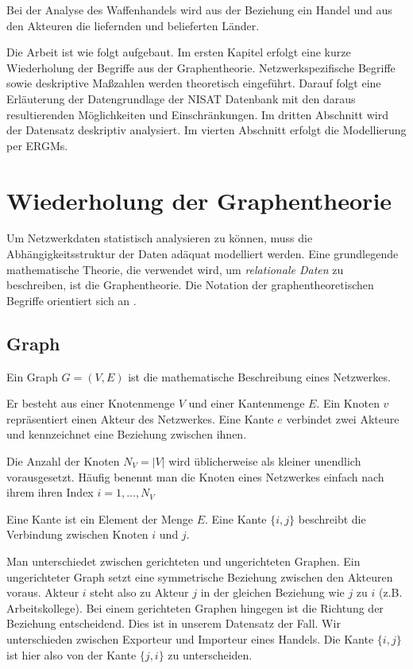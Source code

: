 \documentclass[a4paper,ngerman,oneside,titlepage,bibliography=totoc,11pt]{scrreprt}
\begin{document}
Bei der Analyse des Waffenhandels wird aus der Beziehung ein Handel und aus den Akteuren die liefernden und belieferten Länder.

Die Arbeit ist wie folgt aufgebaut. Im ersten Kapitel erfolgt eine kurze Wiederholung der Begriffe aus der Graphentheorie. Netzwerkspezifische Begriffe sowie deskriptive Maßzahlen werden theoretisch eingeführt. Darauf folgt eine Erläuterung der Datengrundlage der NISAT Datenbank mit den daraus resultierenden Möglichkeiten und Einschränkungen. Im dritten Abschnitt wird der Datensatz deskriptiv analysiert. Im vierten Abschnitt erfolgt die Modellierung per ERGMs.





\section{Wiederholung der Graphentheorie}

Um Netzwerkdaten statistisch analysieren zu können, muss die Abhängigkeitsstruktur der Daten adäquat modelliert werden. Eine grundlegende mathematische Theorie, die verwendet wird, um \emph{relationale Daten} zu beschreiben, ist die Graphentheorie. Die Notation der graphentheoretischen Begriffe orientiert sich an \cite{kc14}.

\subsection{Graph}

Ein Graph $G = (V,E)$ ist die mathematische Beschreibung eines Netzwerkes. 

Er besteht aus einer Knotenmenge $V$ und einer Kantenmenge $E$. Ein Knoten $v$ repräsentiert einen Akteur des Netzwerkes. Eine Kante $e$ verbindet zwei Akteure und kennzeichnet eine Beziehung zwischen ihnen.

Die Anzahl der Knoten $N_V = |V|$ wird üblicherweise als kleiner unendlich vorausgesetzt. Häufig benennt man die Knoten eines Netzwerkes einfach nach ihrem ihren Index $i = 1, ..., N_V$

Eine Kante ist ein Element der Menge $E$. Eine Kante $\{i,j\}$ beschreibt die Verbindung zwischen Knoten $i$ und $j$. 

Man unterschiedet zwischen gerichteten und ungerichteten Graphen. Ein ungerichteter Graph setzt eine symmetrische Beziehung zwischen den Akteuren voraus. Akteur $i$ steht also zu Akteur $j$ in der gleichen Beziehung wie $j$ zu $i$ (z.B. Arbeitskollege). Bei einem gerichteten Graphen hingegen ist die Richtung der Beziehung entscheidend. Dies ist in unserem Datensatz der Fall. Wir unterschieden zwischen Exporteur und Importeur eines Handels. Die Kante $\{i,j\}$ ist hier also von der Kante $\{j,i\}$ zu unterscheiden.
\end{document}
